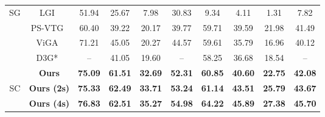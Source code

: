 \begin{table}[t]
\begin{tabular}{cc|c|cccc|cccc}
\hline \hline
\multicolumn{2}{c|}{\multirow{5}{*}{SG}} & LGI~\cite{b26} & 51.94 & 25.67 & 7.98 & \multicolumn{1}{c|}{30.83} & 9.34 & 4.11 & 1.31 & 7.82 \\
\multicolumn{2}{c|}{} & PS-VTG~\cite{b29} & 60.40 & 39.22 & 20.17 & \multicolumn{1}{c|}{39.77} & {59.71} & 39.59 & 21.98 & {41.49} \\
\multicolumn{2}{c|}{} & ViGA~\cite{b11} & 71.21 & 45.05 & 20.27 & \multicolumn{1}{c|}{44.57} & {59.61} & {35.79} & {16.96} & {40.12} \\
\multicolumn{2}{c|}{} & D3G*~\cite{b18} & -- & 41.05 & 19.60 & \multicolumn{1}{c|}{--} & {58.25} & 36.68 & 18.54 & {--} \\
\multicolumn{2}{c|}{} & \textbf{Ours} & {\bf 75.09} & {\bf 61.51} & {\bf 32.69} & \multicolumn{1}{c|}{{\bf 52.31}} & {\bf 60.85} & {\bf 40.60} & {\bf 22.75} & {\bf 42.08} \\  

\hline
\multicolumn{2}{c|}{\multirow{2}{*}{SC}} & \textbf{Ours (2s)} & {\bf 75.33} & {\bf 62.49} & {\bf 33.71} & \multicolumn{1}{c|}{{\bf 53.24}} & {\bf 61.14} & {\bf 43.51} & {\bf 25.79} & {\bf 43.67} \\ 
\multicolumn{2}{c|}{} & \textbf{Ours (4s)} & {\bf 76.83} & {\bf 62.51} & {\bf 35.27} & \multicolumn{1}{c|}{{\bf 54.98}} & {\bf 64.22} & {\bf 45.89} & {\bf 27.38} & {\bf 45.70} \\ 
\bottomrule
\end{tabular}
\vspace{-0.4cm}
\label{tab:SOTA}
\end{table}
